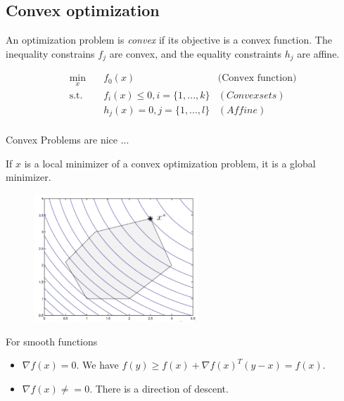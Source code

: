 \documentclass[notes]{beamer}
\begin{document}
\subsection{Convex optimization} 

\begin{frame}
	\begin{define}
		An optimization problem is \emph{convex} if its objective is a convex function. The inequality constrains $f_j$ are convex, and the equality constraints $h_j$ are affine. 
	\end{define} 
	\begin{equation}
		\begin{aligned}
			\min_x \quad & f_0(x)  & \text{(Convex function)} \\ 
			\textrm{s.t.} \quad & f_i(x) \le 0, i = \{1,...,k\} & (Convex sets) \\  
					 \quad & h_j(x) = 0, j = \{1,...,l\} & (Affine) \\ 
		\end{aligned}
	\end{equation}
\end{frame}
\begin{frame}
	{Convex Problems are nice ...}
	\begin{thm}
		If $\hat{x}$ is a local minimizer of a convex optimization problem, it is a global minimizer. 
	\end{thm}
	\begin{figure}
		\includegraphics[width=0.55\textwidth]{2018-03-05-12-00-04.png} 
		\end{figure}
	
\end{frame}

\begin{frame}
	{For smooth functions} 
	\begin{thm}
		\begin{itemize}
			\item $\nabla f(x)=0$. We have $f(y) \ge f(x)+\nabla f(x)^T (y-x) = f(x) $. 
			\item  $\nabla f(x) \neq =0 $. There is a direction of descent. 
		\end{itemize}
	\end{thm}
\end{frame}
\end{document}
